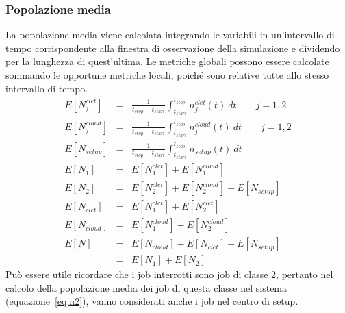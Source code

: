 \subsubsection{Popolazione media}
La popolazione media viene calcolata integrando le variabili in un'intervallo di 
tempo corrispondente alla finestra di osservazione della simulazione e dividendo
per la lunghezza di quest'ultima. Le metriche globali possono essere calcolate
sommando le opportune metriche locali, poiché sono relative tutte allo stesso
intervallo di tempo.
{\setlength\arraycolsep{2pt}
\begin{eqnarray}
\label{eq:njclet}
E[N_j^{clet}] & = &
\frac{1}{t_{stop} - t_{start}} 
\displaystyle \int_{t_{start}}^{t_{stop}} n_j^{clet}(t) \ dt
\qquad j = 1, 2 
\\[10pt]
\label{eq:njcloud}
E[N_j^{cloud}] & = &
\frac{1}{t_{stop} - t_{start}} 
\displaystyle \int_{t_{start}}^{t_{stop}} n_j^{cloud}(t) \ dt
\qquad j = 1, 2 
\\[10pt]
\label{eq:nsetup}
E[N_{setup}] & = &
\frac{1}{t_{stop} - t_{start}} 
\displaystyle \int_{t_{start}}^{t_{stop}} n_{setup}(t) \ dt
\\[10pt]
\label{eq:n1}
E[N_{1}] & = & E[N_1^{clet}] + E[N_1^{cloud}]
\\[10pt]
\label{eq:n2}
E[N_{2}] & = & E[N_2^{clet}] + E[N_2^{cloud}] + E[N_{setup}]
\\[10pt]
\label{eq:nclet}
E[N_{clet}] & = & E[N_1^{clet}] + E[N_2^{clet}]
\\[10pt]
\label{eq:ncloud}
E[N_{cloud}] & = & E[N_1^{cloud}] + E[N_2^{cloud}]
\\[10pt]
\label{eq:n}
E[N] & = & E[N_{cloud}] + E[N_{clet}] + E[N_{setup}] 
\\   & = & E[N_{1}] + E[N_{2}]
\end{eqnarray}
%
Può essere utile ricordare che i job interrotti sono job di classe 2, pertanto
nel calcolo della popolazione media dei job di questa classe nel sistema
(equazione~\ref{eq:n2}), vanno considerati anche i job nel centro di setup.
%
}
